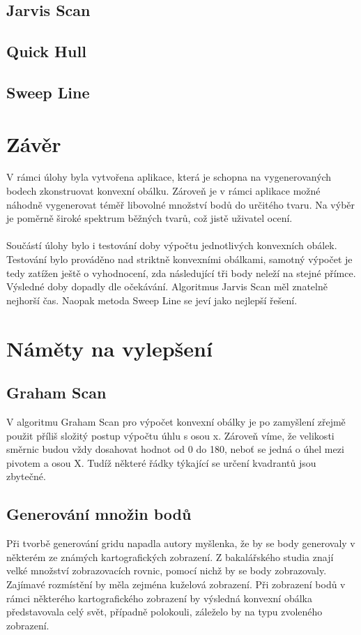 \documentclass[a4paper, 12pt]{article}
\begin{document}
\subsection{Jarvis Scan}
\subsection{Quick Hull}
\subsection{Sweep Line}


\clearpage
\section{Závěr}
V rámci úlohy byla vytvořena aplikace, která je schopna na vygenerovaných bodech zkonstruovat konvexní obálku. Zároveň je v rámci aplikace možné náhodně vygenerovat téměř libovolné množství bodů do určitého tvaru. Na výběr je poměrně široké spektrum běžných tvarů, což jistě uživatel ocení.\\
\\
Součástí úlohy bylo i testování doby výpočtu jednotlivých konvexních obálek. Testování bylo prováděno nad striktně konvexními obálkami, samotný výpočet je tedy zatížen ještě o vyhodnocení, zda následující tři body neleží na stejné přímce. Výsledné doby dopadly dle očekávání. Algoritmus Jarvis Scan měl znatelně nejhorší čas. Naopak metoda Sweep Line se jeví jako nejlepší řešení.

\section{Náměty na vylepšení}
\subsection{Graham Scan}
V algoritmu Graham Scan pro výpočet konvexní obálky je po zamyšlení zřejmě použit příliš složitý postup výpočtu úhlu s osou x. Zároveň víme, že velikosti směrnic budou vždy dosahovat hodnot od 0 do 180, neboť se jedná o úhel mezi pivotem a osou X. Tudíž některé řádky týkající se určení kvadrantů jsou zbytečné.

\subsection{Generování množin bodů}
Při tvorbě generování gridu napadla autory myšlenka, že by se body generovaly v některém ze známých kartografických zobrazení. Z bakalářského studia znají velké množství zobrazovacích rovnic, pomocí nichž by se body zobrazovaly. Zajímavé rozmístění by měla zejména kuželová zobrazení. Při zobrazení bodů v rámci některého kartografického zobrazení by výsledná konvexní obálka představovala celý svět, případně polokouli, záleželo by na typu zvoleného zobrazení.
\end{document}
